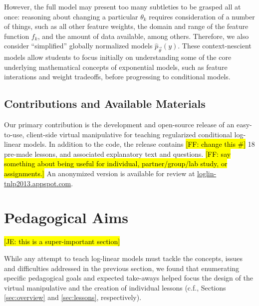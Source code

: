 \documentclass[11pt,letterpaper]{article}
\newcommand{\Note}[1]{}
\renewcommand{\Note}[1]{\hl{[#1]}}
\newcommand{\NoteSigned}[3]{{\sethlcolor{#2}\Note{#1: #3}}}
\newcommand{\NoteFF}[1]{\NoteSigned{FF}{LightBlue}{#1}}
\newcommand{\NoteJE}[1]{\NoteSigned{JE}{LightGreen}{#1}}
\newcommand{\WhereToFind}[0]{\url{loglin-tnlp2013.appspot.com}}
\begin{document}
However, the full model may present too many subtleties to be grasped all at once: reasoning about changing a particular $\theta_k$ requires consideration of a number of things, such as all other feature weights, the domain and range of the feature function $f_k$, and the amount of data available, among others. Therefore, we also consider ``simplified'' globally normalized models $\hat{p}_{\vec{\theta}}\left(y\right)$. These context-nescient models allow students to focus initially on understanding some of the core underlying mathematical concepts of exponential models, such as feature interations and weight tradeoffs, before progressing to conditional models.

\subsection{Contributions and Available Materials}
Our primary contribution is the development and open-source release of an easy-to-use, client-side virtual manipulative for teaching regularized conditional log-linear models. In addition to the code, the release contains \NoteFF{change this \#} 18 pre-made lessons, and associated explanatory text and questions. \NoteFF{say something about being useful for individual, partner/group/lab study, or assignments.} An anonymized version is available for review at \WhereToFind{}.


\section{Pedagogical Aims}\label{sec:aims}

\NoteJE{this is a super-important section}

While any attempt to teach log-linear models must tackle the concepts, issues and difficulties addressed in the previous section, we found that enumerating specific pedagogical goals and expected take-aways helped focus the design of the virtual manipulative and the creation of individual lessons (c.f., Sections \ref{sec:overview} and \ref{sec:lessons}, respectively).
\end{document}
